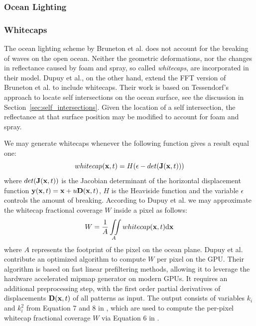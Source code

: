 \subsubsection{Ocean Lighting}
\cite{article:oceanlighting}
\subsubsection{Whitecaps}
The ocean lighting scheme by Bruneton et al. \cite{article:oceanlighting} does
not account for the breaking of waves on the open ocean. Neither the geometric
deformations, nor the changes in reflectance caused by foam and spray, so called
\emph{whitecaps}, are incorporated in their model. Dupuy et al.\cite{article:whitecaps},
on the other hand, extend the FFT version of Bruneton et al.\cite{misc:oceanlightingfft}
to include whitecaps. Their work is based on Tessendorf's approach\cite{course:simulatingocean}
to locate self intersections on the ocean surface, see the discussion in Section~\ref{sec:self_intersections}. Given the location of a self intersection,
the reflectance at that surface position may be modified to account for foam
and spray.

We may generate whitecaps whenever the following function gives a result equal
one:
\begin{equation}
 whitecap(\mathbf{x},t) = H(\epsilon - det(\mathbf{J}(\mathbf{x},t)))
\end{equation}
where $det(\mathbf{J}(\mathbf{x},t))$ is the Jacobian determinant of the horizontal
displacement function $\mathbf{y}(\mathbf{x},t) = \mathbf{x}+u\mathbf{D}(\mathbf{x},t)$,
$H$ is the Heaviside function and the variable $\epsilon$ controls the amount of
breaking. According to Dupuy et al. we may approximate the whitecap fractional
coverage $W$ inside a pixel as follows:
\begin{equation}
 W = \frac{1}{A}\iint\limits_A whitecap(\mathbf{x},t)\mathrm{d}\mathbf{x}
\end{equation}
where $A$ represents the footprint of the pixel on the ocean plane. Dupuy et al.
contribute an optimized algorithm to compute $W$ per pixel on the GPU. Their
algorithm is based on fast linear prefiltering methods, allowing it to leverage
the hardware accelerated mipmap generator on modern GPUs. It requires an
additional preprocessing step, with the first order partial derivatives of
displacements $\mathbf{D}(\mathbf{x},t)$ of all patterns as input. The output
consists of variables $k_i$ and $k_i^2$ from Equation 7 and 8 in
\cite{article:whitecaps}, which are used to compute the per-pixel whitecap
fractional coverage $W$ via Equation 6 in \cite{article:whitecaps}.

